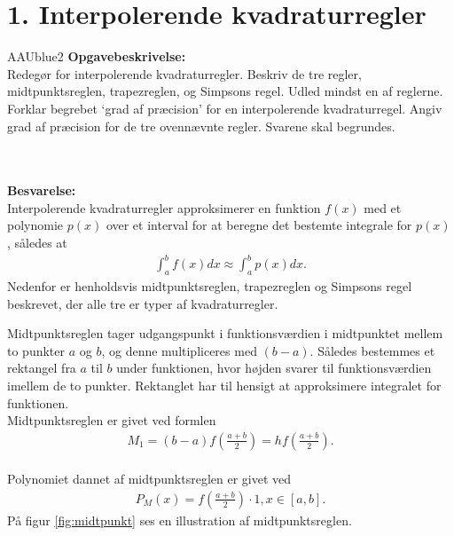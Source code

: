 \section*{1. Interpolerende kvadraturregler}
% 
%
\begin{color}{AAUblue2}
%
\textbf{Opgavebeskrivelse:} \\
Redegør for interpolerende kvadraturregler. 
Beskriv de tre regler, midtpunktsreglen, trapezreglen, og Simpsons regel. 
Udled mindst en af reglerne. Forklar begrebet ‘grad af præcision’ for en interpolerende kvadraturregel. 
Angiv grad af præcision for de tre ovennævnte regler. 
Svarene skal begrundes.
% 
\end{color}
\\\\
%  
\textbf{Besvarelse:} \\
Interpolerende kvadraturregler approksimerer en funktion $f(x)$ med et polynomie $p(x)$ over et interval for at beregne det bestemte integrale for $p(x)$, således at 
\begin{align}
    \int_{a}^{b} f(x) dx \approx \int_{a}^{b} p(x) dx.
\end{align}
Nedenfor er henholdsvis midtpunktsreglen, trapezreglen og Simpsons regel beskrevet, der alle tre er typer af kvadraturregler.  

Midtpunktsreglen tager udgangspunkt i funktionsværdien i midtpunktet mellem to punkter $a$ og $b$, og denne multipliceres med $(b-a)$.
Således bestemmes et rektangel fra $a$ til $b$ under funktionen, hvor højden svarer til funktionsværdien imellem de to punkter. 
Rektanglet har til hensigt at approksimere integralet for funktionen. \\
Midtpunktsreglen er givet ved formlen
\begin{align*}
M_1 = (b-a)f(\frac{a+b}{2})=hf(\frac{a+b}{2}).    
\end{align*}
\\
Polynomiet dannet af midtpunktsreglen er givet ved  
\begin{align*}
P_{M}(x)=f(\frac{a+b}{2}) \cdot 1, x \in \left [a,b  \right ].
\end{align*}
På figur \ref{fig:midtpunkt} ses en illustration af midtpunktsreglen. 


